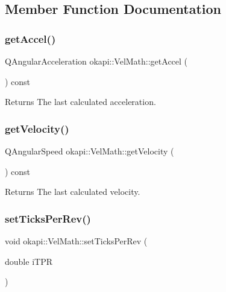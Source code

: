 \subsection{Member Function Documentation}
\mbox{\label{classokapi_1_1VelMath_ac47c50d2fc6035739607801d1aa2272d}} 
\subsubsection{\texorpdfstring{getAccel()}{getAccel()}}
{\footnotesize\ttfamily Q\+Angular\+Acceleration okapi\+::\+Vel\+Math\+::get\+Accel (\begin{DoxyParamCaption}{ }\end{DoxyParamCaption}) const\hspace{0.3cm}{\ttfamily [virtual]}}

\begin{DoxyReturn}{Returns}
The last calculated acceleration. 
\end{DoxyReturn}
\mbox{\label{classokapi_1_1VelMath_ae366b0895bfac15e986448aa9c22b26c}} 
\subsubsection{\texorpdfstring{getVelocity()}{getVelocity()}}
{\footnotesize\ttfamily Q\+Angular\+Speed okapi\+::\+Vel\+Math\+::get\+Velocity (\begin{DoxyParamCaption}{ }\end{DoxyParamCaption}) const\hspace{0.3cm}{\ttfamily [virtual]}}

\begin{DoxyReturn}{Returns}
The last calculated velocity. 
\end{DoxyReturn}
\mbox{\label{classokapi_1_1VelMath_a0a95837a35bfb2702a170da95daba559}} 
\subsubsection{\texorpdfstring{setTicksPerRev()}{setTicksPerRev()}}
{\footnotesize\ttfamily void okapi\+::\+Vel\+Math\+::set\+Ticks\+Per\+Rev (\begin{DoxyParamCaption}\item[{double}]{i\+T\+PR }\end{DoxyParamCaption})\hspace{0.3cm}{\ttfamily [virtual]}}

